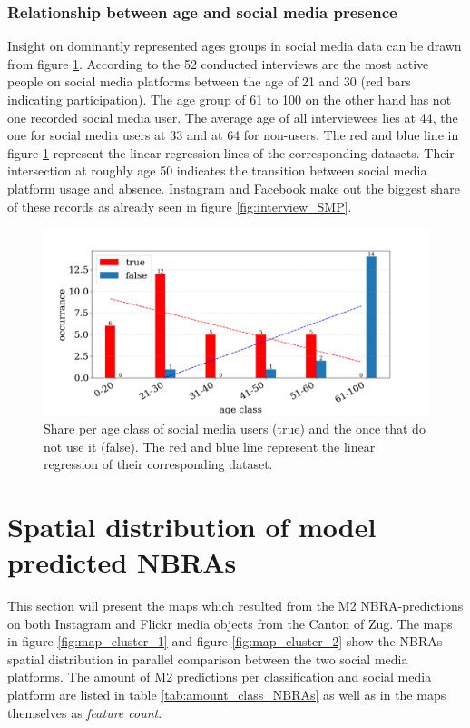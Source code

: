 \subsubsection{Relationship between age and social media presence}
Insight on dominantly represented ages groups in social media data can be drawn from figure \ref{fig:interview_age_SMP}. According to the 52 conducted interviews are the most active people on social media platforms between the age of 21 and 30 (red bars indicating participation). The age group of 61 to 100 on the other hand has not one recorded social media user. The average age of all interviewees lies at 44, the one for social media users at 33 and at 64 for non-users. The red and blue line in figure \ref{fig:interview_age_SMP} represent the linear regression lines of the corresponding datasets. Their intersection at roughly age 50 indicates the transition between social media platform usage and absence. Instagram and Facebook make out the biggest share of these records as already seen in figure \ref{fig:interview_SMP}.

\begin{figure}[h!]
   \centering
   \includegraphics[width=\textwidth]{img/interview_socialmedia_age_bigger_font.pdf}
   \caption{Share per age class of social media users (true) and the once that do not use it (false). The red and blue line represent the linear regression of their corresponding dataset.}
   \label{fig:interview_age_SMP}
\end{figure}

\section{Spatial distribution of model predicted NBRAs} \label{results_spatial_dist_model_NBRA}
This section will present the maps which resulted from the M2 NBRA-predictions on both Instagram and Flickr media objects from the Canton of Zug. The maps in figure \ref{fig:map_cluster_1} and figure \ref{fig:map_cluster_2} show the NBRAs spatial distribution in parallel comparison between the two social media platforms. The amount of M2 predictions per classification and social media platform are listed in table \ref{tab:amount_class_NBRAs} as well as in the maps themselves as \textit{feature count}.

